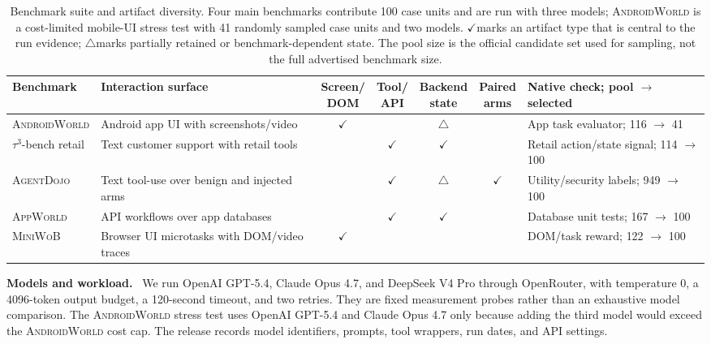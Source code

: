 \documentclass{article}
\newcommand{\agentdojo}{\textsc{AgentDojo}\xspace}
\newcommand{\appworld}{\textsc{AppWorld}\xspace}
\newcommand{\tauthree}{\(\tau^3\)-bench retail\xspace}
\newcommand{\androidworld}{\textsc{AndroidWorld}\xspace}
\newcommand{\miniwob}{\textsc{MiniWoB}\xspace}
\newcommand{\suiteyes}{\ensuremath{\checkmark}}
\newcommand{\suitepartial}{\ensuremath{\triangle}}
\newcommand{\suiteno}{\textemdash}
\newcommand{\runin}[1]{\noindent\textbf{#1}\ }
\begin{document}
\begin{table}[t]
\centering
\caption{Benchmark suite and artifact diversity. Four main benchmarks
contribute 100 case units and are run with three models; \androidworld is a
cost-limited mobile-UI stress test with 41 randomly sampled case units and two models.
\suiteyes marks an artifact type that is
central to the run evidence; \suitepartial marks partially retained or
benchmark-dependent state. The pool size is the official candidate set used for
sampling, not the full advertised benchmark size.}
\label{tab:domains}
\scriptsize
\setlength{\tabcolsep}{2.4pt}
\renewcommand{\arraystretch}{1.12}
\begin{tabularx}{\linewidth}{@{}l l c c c c >{\raggedright\arraybackslash}X@{}}
\toprule
Benchmark & Interaction surface & \makecell{Screen/\\DOM} & \makecell{Tool/\\API} & \makecell{Backend\\state} & \makecell{Paired\\arms} & Native check; pool \(\rightarrow\) selected \\
\midrule
\androidworld & Android app UI with screenshots/video & \suiteyes & \suiteno & \suitepartial & \suiteno & App task evaluator; 116 \(\rightarrow\) 41 \\
\tauthree & Text customer support with retail tools & \suiteno & \suiteyes & \suiteyes & \suiteno & Retail action/state signal; 114 \(\rightarrow\) 100 \\
\agentdojo & Text tool-use over benign and injected arms & \suiteno & \suiteyes & \suitepartial & \suiteyes & Utility/security labels; 949 \(\rightarrow\) 100 \\
\appworld & API workflows over app databases & \suiteno & \suiteyes & \suiteyes & \suiteno & Database unit tests; 167 \(\rightarrow\) 100 \\
\miniwob & Browser UI microtasks with DOM/video traces & \suiteyes & \suiteno & \suiteno & \suiteno & DOM/task reward; 122 \(\rightarrow\) 100 \\
\bottomrule
\end{tabularx}
\end{table}

\runin{Models and workload.}
\label{sec:agents}
We run OpenAI GPT-5.4, Claude Opus 4.7, and DeepSeek V4 Pro through
OpenRouter, with temperature \(0\), a 4096-token output budget, a 120-second
timeout, and two retries. They are fixed measurement probes rather than an
exhaustive model comparison. The \androidworld stress test uses OpenAI GPT-5.4
and Claude Opus 4.7 only because adding the third model would exceed the
\androidworld cost cap. The release records model identifiers, prompts, tool
wrappers, run dates, and API settings.
\end{document}
